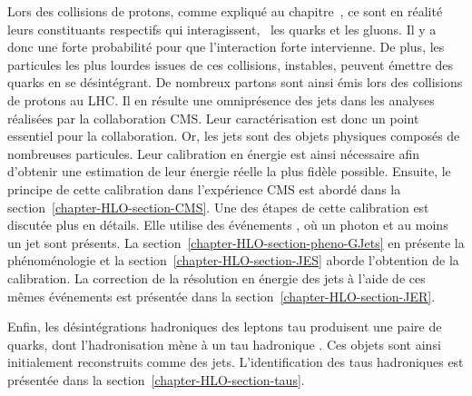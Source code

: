 \par
Lors des collisions de protons, comme expliqué au chapitre~,
ce sont en réalité leurs constituants respectifs qui interagissent,
\ie\ les quarks et les gluons.
Il y a donc une forte probabilité pour que l'interaction forte intervienne.
De plus, les particules les plus lourdes issues de ces collisions, instables, peuvent émettre des quarks en se désintégrant.
De nombreux partons sont ainsi émis lors des collisions de protons au LHC.
Il en résulte une omniprésence des jets dans les analyses réalisées par la collaboration CMS.
Leur caractérisation est donc un point essentiel pour la collaboration.
Or, les jets sont des objets physiques composés de nombreuses particules.
Leur calibration en énergie est ainsi nécessaire afin d'obtenir une estimation de leur énergie réelle la plus fidèle possible.
Ensuite, le principe de cette calibration dans l'expérience CMS est abordé dans la section~\ref{chapter-HLO-section-CMS}.
Une des étapes de cette calibration est discutée plus en détails.
Elle utilise des événements \Gjets, où un photon et au moins un jet sont présents.
La section~\ref{chapter-HLO-section-pheno-GJets} en présente la phénoménologie
et
la section~\ref{chapter-HLO-section-JES} aborde l'obtention de la calibration.
La correction de la résolution en énergie des jets à l'aide de ces mêmes événements est présentée dans la section~\ref{chapter-HLO-section-JER}.
\par
Enfin, les désintégrations hadroniques des leptons tau produisent une paire de quarks, dont l'hadronisation mène à un \og tau hadronique \fg{}.
Ces objets sont ainsi initialement reconstruits comme des jets.
L'identification des taus hadroniques est présentée dans la section~\ref{chapter-HLO-section-taus}.